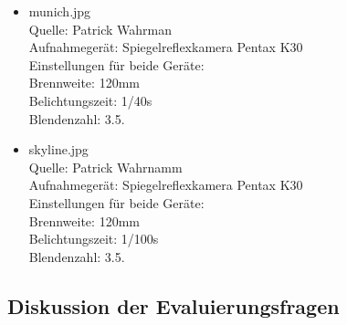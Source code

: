 \documentclass[deutsch]{scrartcl}
\begin{document}
\begin{itemize}
	\item munich.jpg\\
		Quelle: Patrick Wahrman\\
		Aufnahmegerät: Spiegelreflexkamera Pentax K30 \\
		Einstellungen für beide Geräte: \\
		Brennweite: 120mm \\
		Belichtungszeit: 1/40s \\
		Blendenzahl: 3.5.

	\item skyline.jpg\\
		Quelle: Patrick Wahrnamm\\
		Aufnahmegerät: Spiegelreflexkamera Pentax K30 \\
		Einstellungen für beide Geräte: \\
		Brennweite: 120mm \\
		Belichtungszeit: 1/100s\\
		Blendenzahl: 3.5.
\end{itemize}

\subsection{Diskussion der Evaluierungsfragen}
\end{document}
